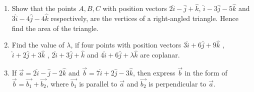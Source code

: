 \begin{enumerate}
\item Show that the points $A, B, C$ with position vectors $2\hat{i} - \hat{j} + \hat{k}$, $\hat{i} - 3\hat{j} - 5\hat{k}$ and
$ 3\hat{i} - 4\hat{j} - 4\hat{k}$ respectively, are the vertices of a right-angled triangle. Hence find the area of the triangle.
\item Find the value of $\lambda$, if four points with position vectors 
$ 3\hat{i} + 6\hat{j} + 9\hat{k}$ ,
$ \hat{i} + 2\hat{j} + 3\hat{k}$ ,
$ 2\hat{i} + 3\hat{j} + \hat{k}$  and
$ 4\hat{i} + 6\hat{j} + \lambda\hat{k}$ are coplanar.
\item If $\vec{a} = 2\hat{i}-\hat{j}-2\hat{k}$ and $\vec{b} = 7\hat{i}+2\hat{j}-3\hat{k}$, then express $\vec{b}$ in the form of $\vec{b}=\vec{b_1}+\vec{b_2}$, where $\vec{b_1}$ is parallel to $\vec{a}$ and $\vec{b_2}$ is perpendicular to $\vec{a}$.
\end{enumerate}

